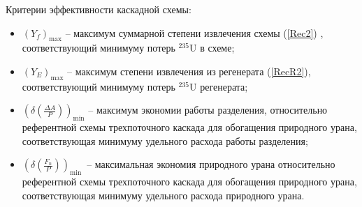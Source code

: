 Критерии эффективности каскадной схемы:
\begin{itemize}
    \item $(Y_f)_\text{max}$ -- максимум суммарной степени извлечения схемы (\ref{Rec2}) , соответствующий минимуму потерь $^{235}$U в схеме;
    \item $(Y_{E})_\text{max}$ -- максимум степени извлечения из регенерата (\ref{RecR2}), соответствующий минимуму потерь $^{235}$U регенерата;
    \item $(\delta(\frac{\Delta A}{P}))_\text{min}$ -- максимум экономии работы разделения, относительно референтной схемы трехпоточного каскада для обогащения природного урана, соответствующая минимуму удельного расхода работы разделения; 
    \item $(\delta(\frac{F_n}{P}))_\text{min}$\ -- максимальная экономия природного урана относительно референтной схемы трехпоточного каскада для обогащения природного урана, соответствующая минимуму удельного расхода природного урана.
\end{itemize}\label{criteria_list}

